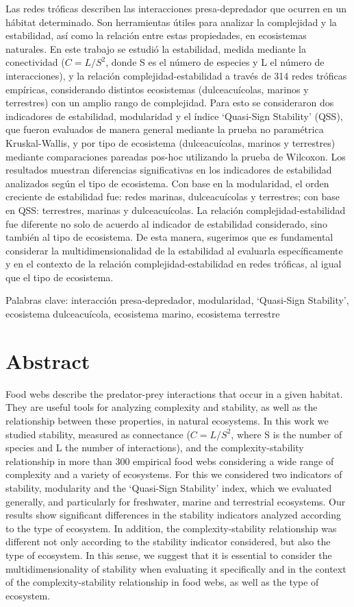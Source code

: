 \documentclass[
]{article}
\begin{document}
Las redes tróficas describen las interacciones presa-depredador que
ocurren en un hábitat determinado. Son herramientas útiles para analizar
la complejidad y la estabilidad, así como la relación entre estas
propiedades, en ecosistemas naturales. En este trabajo se estudió la
estabilidad, medida mediante la conectividad (\(C=L/S^2\), donde S es el
número de especies y L el número de interacciones), y la relación
complejidad-estabilidad a través de 314 redes tróficas empíricas,
considerando distintos ecosistemas (dulceacuícolas, marinos y
terrestres) con un amplio rango de complejidad. Para esto se
consideraron dos indicadores de estabilidad, modularidad y el índice
`Quasi-Sign Stability' (QSS), que fueron evaluados de manera general
mediante la prueba no paramétrica Kruskal-Wallis, y por tipo de
ecosistema (dulceacuícolas, marinos y terrestres) mediante comparaciones
pareadas pos-hoc utilizando la prueba de Wilcoxon. Los resultados
muestran diferencias significativas en los indicadores de estabilidad
analizados según el tipo de ecosistema. Con base en la modularidad, el
orden creciente de estabilidad fue: redes marinas, dulceacuícolas y
terrestres; con base en QSS: terrestres, marinas y dulceacuícolas. La
relación complejidad-estabilidad fue diferente no solo de acuerdo al
indicador de estabilidad considerado, sino también al tipo de
ecosistema. De esta manera, sugerimos que es fundamental considerar la
multidimensionalidad de la estabilidad al evaluarla específicamente y en
el contexto de la relación complejidad-estabilidad en redes tróficas, al
igual que el tipo de ecosistema.

Palabras clave: interacción presa-depredador, modularidad, `Quasi-Sign
Stability', ecosistema dulceacuícola, ecosistema marino, ecosistema
terrestre

\hypertarget{abstract}{%
\section{Abstract}\label{abstract}}

Food webs describe the predator-prey interactions that occur in a given
habitat. They are useful tools for analyzing complexity and stability,
as well as the relationship between these properties, in natural
ecosystems. In this work we studied stability, measured as connectance
(\(C=L/S^2\), where S is the number of species and L the number of
interactions), and the complexity-stability relationship in more than
300 empirical food webs considering a wide range of complexity and a
variety of ecosystems. For this we considered two indicators of
stability, modularity and the `Quasi-Sign Stability' index, which we
evaluated generally, and particularly for freshwater, marine and
terrestrial ecosystems. Our results show significant differences in the
stability indicators analyzed according to the type of ecosystem. In
addition, the complexity-stability relationship was different not only
according to the stability indicator considered, but also the type of
ecosystem. In this sense, we suggest that it is essential to consider
the multidimensionality of stability when evaluating it specifically and
in the context of the complexity-stability relationship in food webs, as
well as the type of ecosystem.
\end{document}
